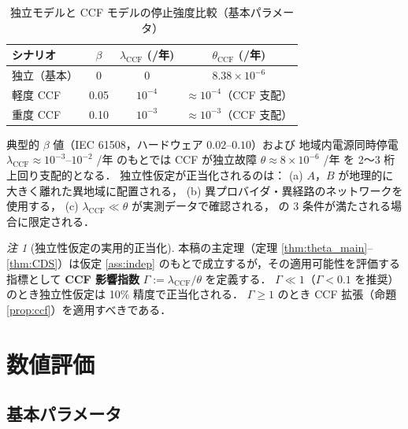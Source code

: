 \documentclass[12pt,a4paper]{article}
\theoremstyle{plain}
\theoremstyle{definition}
\theoremstyle{remark}
\newtheorem{remark}[theorem]{注}
\begin{document}
\begin{table}[H]
  \centering
  \caption{独立モデルと CCF モデルの停止強度比較（基本パラメータ）}
  \label{tab:CCF}
  \begin{tabular}{lccc}
    \toprule
    シナリオ & $\beta$ & $\lambda_{\mathrm{CCF}}$ (/年) & $\theta_{\mathrm{CCF}}$ (/年) \\
    \midrule
    独立（基本） & 0 & 0 & $8.38\times10^{-6}$ \\
    軽度 CCF & 0.05 & $10^{-4}$ & $\approx 10^{-4}$（CCF 支配） \\
    重度 CCF & 0.10 & $10^{-3}$ & $\approx 10^{-3}$（CCF 支配） \\
    \bottomrule
  \end{tabular}
  \vspace{2pt}
  {\small
    典型的 $\beta$ 値（IEC 61508，ハードウェア $0.02$--$0.10$）および
    地域内電源同時停電 $\lambda_{\mathrm{CCF}}\approx10^{-3}$--$10^{-2}$ /年 のもとでは
    CCF が独立故障 $\theta\approx8\times10^{-6}$ /年 を 2〜3 桁上回り支配的となる．
    独立性仮定が正当化されるのは：
    (a) $A$，$B$ が地理的に大きく離れた異地域に配置される，
    (b) 異プロバイダ・異経路のネットワークを使用する，
    (c) $\lambda_{\mathrm{CCF}}\ll\theta$ が実測データで確認される，
    の 3 条件が満たされる場合に限定される．}
\end{table}

\begin{remark}[独立性仮定の実用的正当化]
  本稿の主定理（定理 \ref{thm:theta_main}--\ref{thm:CDS}）は仮定 \ref{ass:indep}
  のもとで成立するが，その適用可能性を評価する指標として
  \textbf{CCF 影響指数} $\Gamma := \lambda_{\mathrm{CCF}}/\theta$ を定義する．
  $\Gamma \ll 1$（$\Gamma < 0.1$ を推奨）のとき独立性仮定は
  10\% 精度で正当化される．
  $\Gamma \ge 1$ のとき CCF 拡張（命題 \ref{prop:ccf}）を適用すべきである．
\end{remark}

\section{数値評価}\label{sec:numerical}

\subsection{基本パラメータ}
\end{document}
